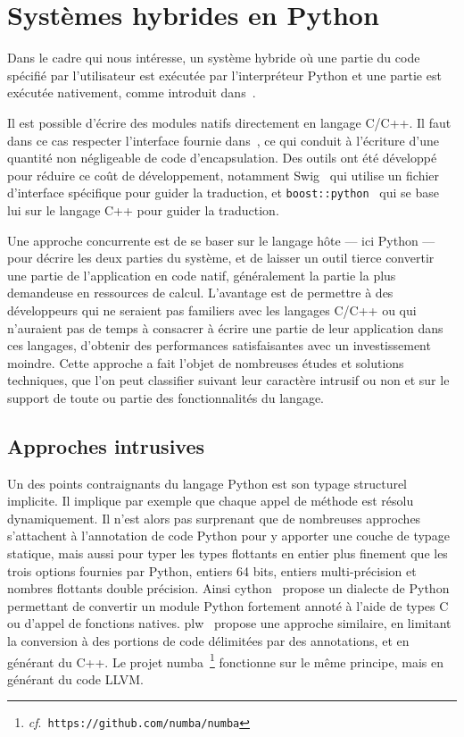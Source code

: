 \documentclass[renpar]{compas2013}
\begin{document}
\section{Systèmes hybrides en Python}\label{sec:python-hybrid}

Dans le cadre qui nous intéresse, un système hybride où une partie du code
spécifié par l'utilisateur est exécutée par l'interpréteur Python et une
partie est exécutée nativement, comme introduit dans~\cite{dongara2007}.

Il est possible d'écrire des modules natifs directement en langage C/C++.
Il faut dans ce cas respecter l'interface fournie dans~\cite{pythoncapi},
ce qui conduit à l'écriture d'une quantité non négligeable de code
d'encapsulation. Des outils ont été développé pour réduire ce coût de
développement, notamment Swig~\cite{swig2003} qui utilise un fichier
d'interface spécifique pour guider la traduction, et
\texttt{boost::python}~\cite{boostpython2007} qui se base lui sur le
langage C++ pour guider la traduction.

Une approche concurrente est de se baser sur le langage hôte --- ici
Python --- pour décrire les deux parties du système, et de laisser un
outil tierce convertir une partie de l'application en code natif,
généralement la partie la plus demandeuse en ressources de calcul.
L'avantage est de permettre à des développeurs qui ne seraient pas
familiers avec les langages C/C++ ou qui n'auraient pas de temps à
consacrer à écrire une partie de leur application dans ces langages,
d'obtenir des performances satisfaisantes avec un investissement moindre.
Cette approche a fait l'objet de nombreuses études et solutions
techniques, que l'on peut classifier suivant leur caractère intrusif ou
non et sur le support de toute ou partie des fonctionnalités du langage.

\subsection{Approches intrusives}

Un des points contraignants du langage Python est son typage structurel
implicite. Il implique par exemple que chaque appel de méthode est résolu
dynamiquement. Il n'est alors pas surprenant que de nombreuses approches
s'attachent à l'annotation de code Python pour y apporter une couche de
typage statique, mais aussi pour typer les types flottants en entier plus
finement que les trois options fournies par Python, entiers 64 bits,
entiers multi-précision et nombres flottants double précision. Ainsi
cython~\cite{cython2010} propose un dialecte de Python permettant de
convertir un module Python fortement annoté à l'aide de types C ou d'appel
de fonctions natives. plw~\cite{dongara2007} propose une approche
similaire, en limitant la conversion à des portions de code délimitées par
des annotations, et en générant du C++. Le projet
numba~\footnote{\emph{cf}.\ \texttt{https://github.com/numba/numba}}
fonctionne sur le même principe, mais en générant du code LLVM.
\end{document}
